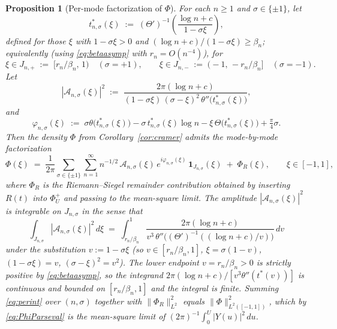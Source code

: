 \documentclass[11pt]{article}
\newtheorem{proposition}{Proposition}
\begin{document}
\begin{proposition}[Per-mode factorization of $\Phi$]\label{prop:factor}
For each $n\ge 1$ and $\sigma\in\{\pm1\}$, let
\begin{equation}\label{eq:tstar}
t^{*}_{n,\sigma}(\xi)\;:=\;(\Theta')^{-1}\!\left(\frac{\log n+c}{1-\sigma\xi}\right),
\end{equation}
defined for those $\xi$ with $1-\sigma\xi>0$ and $(\log n+c)/(1-\sigma\xi)\ge\beta_n$; equivalently (using \eqref{eq:betaasymp} with $r_n=O(n^{-4})$), for
\begin{equation}\label{eq:Jns}
\xi\in J_{n,+}\;:=\;\bigl[r_n/\beta_n,\,1\bigr)\quad (\sigma=+1),\qquad \xi\in J_{n,-}\;:=\;\bigl(-1,\,-r_n/\beta_n\bigr]\quad (\sigma=-1).
\end{equation}
Let
\begin{equation}\label{eq:Ans}
|\mathcal A_{n,\sigma}(\xi)|^{2}\;:=\;\frac{2\pi(\log n+c)}{(1-\sigma\xi)\,(\sigma-\xi)^{2}\,\theta''\!\bigl(t^{*}_{n,\sigma}(\xi)\bigr)},
\end{equation}
and
\begin{equation}\label{eq:varphins}
\varphi_{n,\sigma}(\xi)\;:=\;\sigma\theta\!\bigl(t^{*}_{n,\sigma}(\xi)\bigr)-\sigma\,t^{*}_{n,\sigma}(\xi)\log n-\xi\,\Theta\!\bigl(t^{*}_{n,\sigma}(\xi)\bigr)+\tfrac{\pi}{4}\sigma.
\end{equation}
Then the density $\Phi$ from Corollary~\ref{cor:cramer} admits the mode-by-mode factorization
\begin{equation}\label{eq:Phifactor}
\Phi(\xi)\;=\;\frac{1}{2\pi}\sum_{\sigma\in\{\pm1\}}\sum_{n=1}^{\infty}n^{-1/2}\,\mathcal A_{n,\sigma}(\xi)\,e^{i\varphi_{n,\sigma}(\xi)}\,\mathbf{1}_{J_{n,\sigma}}(\xi)\;+\;\Phi_R(\xi),\qquad \xi\in[-1,1],
\end{equation}
where $\Phi_R$ is the Riemann--Siegel remainder contribution obtained by inserting $R(t)$ into $\Phi_U^+$ and passing to the mean-square limit. The amplitude $|\mathcal A_{n,\sigma}(\xi)|^{2}$ is integrable on $J_{n,\sigma}$ in the sense that
\begin{equation}\label{eq:perint}
\int_{J_{n,\sigma}}|\mathcal A_{n,\sigma}(\xi)|^{2}\,d\xi\;=\;\int_{r_n/\beta_n}^{1}\frac{2\pi(\log n+c)}{v^{3}\,\theta''\!\bigl((\Theta')^{-1}((\log n+c)/v)\bigr)}\,dv
\end{equation}
under the substitution $v:=1-\sigma\xi$ (so $v\in[r_n/\beta_n,1]$, $\xi=\sigma(1-v)$, $(1-\sigma\xi)=v$, $(\sigma-\xi)^{2}=v^{2}$). The lower endpoint $v=r_n/\beta_n>0$ is strictly positive by \eqref{eq:betaasymp}, so the integrand $2\pi(\log n+c)/[v^{3}\theta''(t^{*}(v))]$ is continuous and bounded on $[r_n/\beta_n,1]$ and the integral is finite. Summing \eqref{eq:perint} over $(n,\sigma)$ together with $\|\Phi_R\|_{L^{2}}^{2}$ equals $\|\Phi\|_{L^{2}([-1,1])}^{2}$, which by \eqref{eq:PhiParseval} is the mean-square limit of $(2\pi)^{-1}\int_{0}^{U}|Y(u)|^{2}\,du$.
\end{proposition}
\end{document}
